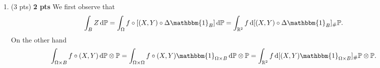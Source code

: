 \begin{enumerate}[label={(\alph*)}]
%
%
%
%
\item (3 pts)
\textbf{2 pts}
We first observe that
\[
	\int_B Z \, \dd \bbP = \int_\Omega f \circ [(X,Y) \circ \Delta \mathbbm{1}_B] \, \dd \bbP
	= \int_{\bbR^2} f \, \dd [(X,Y) \circ \Delta \mathbbm{1}_B]_\# \bbP.
\]
On the other hand
\[
	\int_{\Omega \times B} f \circ (X,Y) \, \dd \bbP \otimes \bbP
	= \int_{\Omega \times \Omega} f \circ (X,Y)\mathbbm{1}_{\Omega \times B} \, \dd \bbP \otimes \bbP
	= \int_{\bbR^2} f \, \dd [(X,Y)\mathbbm{1}_{\Omega \times B}]_\# \bbP \otimes \bbP.
\]


\end{enumerate}
